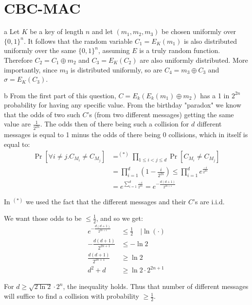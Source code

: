 \documentclass{article}
\begin{document}
\section{CBC-MAC}
\begin{paragraph}
	a Let $K$ be a key of length $n$ and let $(m_1, m_2, m_3)$ be chosen uniformly over $\{0, 1\}^n$. It follows that the random variable $C_1 = E_K(m_1)$ is also distributed uniformly over the same $\{0, 1\}^n$, assuming $E$ is a truly random function. Therefore $C_2 = C_1 \oplus m_2$ and $C_3 = E_K(C_2)$ are also uniformly distributed. More importantly, since $m_3$ is distributed uniformly, so are $C_4 = m_3 \oplus C_3$ and $\sigma = E_K(C_3)$.
\end{paragraph}

\begin{paragraph}
    b From the first part of this question, $C = E_k(E_k(m_1) \oplus m_2)$ has a 1 in $2^{2n}$ probability for having any specific value. From the birthday "paradox" we know that the odds of two such $C$'s (from two different messages) getting the same value are $\frac{1}{2^{2n}}$. The odds then of there being such a collision for $d$ different messages is equal to 1 minus the odds of there being 0 collisions, which in itself is equal to:
    \begin{align*}
        \Pr[\forall i \neq j. C_{M_i} \neq C_{M_j}] &=^{(*)} \prod\limits_{1 \leq i < j \leq d}\Pr[C_{M_i} \neq C_{M_j}]\\
        &= \prod\limits_{i = 1}^d \left(1 - \frac{i}{2^{2n}}\right) \leq \prod\limits_{i = 1}^d e^{\frac{-i}{2^{2n}}}\\
        &= e^{\sum\limits_{i = 1}^d \frac{-i}{2^{2n}}} = e^{-\frac{d(d + 1)}{2^{2n+1}}}
    \end{align*}
    
    In $^{(*)}$ we used the fact that the different messages and their $C$'s are i.i.d.
    
    We want those odds to be $\leq \frac{1}{2}$, and so we get:
    \begin{align*}
        e^{-\frac{d(d + 1)}{2^{2n+1}}} &\leq \frac{1}{2} \quad |\ln(\cdot)\\
        -\frac{d(d + 1)}{2^{2n+1}} &\leq -\ln2\\
        \frac{d(d + 1)}{2^{2n+1}} &\geq \ln2\\
        d^2 + d &\geq \ln2 \cdot 2^{2n+1}
    \end{align*}
    
    For $d \geq \sqrt{2\ln2} \cdot 2^n$, the inequality holds. Thus that number of different messages will suffice to find a collision with probability $\geq \frac{1}{2}$.
\end{paragraph}
\end{document}

